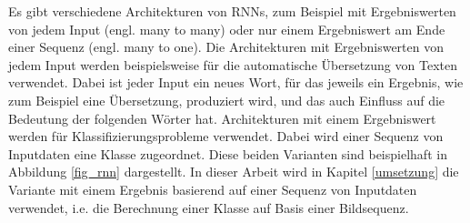 Es gibt verschiedene Architekturen von \acp{RNN}, zum Beispiel mit Ergebniswerten von jedem Input (engl. many to many) oder nur einem Ergebniswert am Ende einer Sequenz (engl. many to one). Die Architekturen mit Ergebniswerten von jedem Input werden beispielsweise für die automatische Übersetzung von Texten verwendet. Dabei ist jeder Input ein neues Wort, für das jeweils ein Ergebnis, wie zum Beispiel eine Übersetzung, produziert wird, und das auch Einfluss auf die Bedeutung der folgenden Wörter hat. Architekturen mit einem Ergebniswert werden für Klassifizierungsprobleme verwendet. Dabei wird einer Sequenz von Inputdaten eine Klasse zugeordnet. Diese beiden Varianten sind beispielhaft in Abbildung \ref{fig_rnn} dargestellt. In dieser Arbeit wird in Kapitel \ref{umsetzung} die Variante mit einem Ergebnis basierend auf einer Sequenz von Inputdaten verwendet, i.e. die Berechnung einer Klasse auf Basis einer Bildsequenz.

